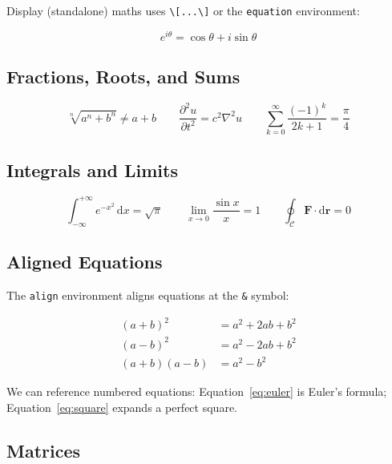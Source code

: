 \documentclass[12pt, a4paper]{article}
\theoremstyle{definition}
\theoremstyle{plain}
\theoremstyle{remark}
\newcommand{\dx}{\,\mathrm{d}x}        %
\begin{document}
Display (standalone) maths uses \verb|\[...\]| or the
\texttt{equation} environment:

\begin{equation}
  \label{eq:euler}
  e^{i\theta} = \cos\theta + i\sin\theta
\end{equation}

\subsection{Fractions, Roots, and Sums}

\[
  \sqrt[n]{a^n + b^n} \neq a + b
  \qquad
  \frac{\partial^2 u}{\partial t^2} = c^2 \nabla^2 u
  \qquad
  \sum_{k=0}^{\infty} \frac{(-1)^k}{2k+1} = \frac{\pi}{4}
\]

\subsection{Integrals and Limits}

\[
  \int_{-\infty}^{+\infty} e^{-x^2} \dx = \sqrt{\pi}
  \qquad
  \lim_{x \to 0} \frac{\sin x}{x} = 1
  \qquad
  \oint_{\mathcal{C}} \mathbf{F} \cdot \mathrm{d}\mathbf{r} = 0
\]

\subsection{Aligned Equations}

The \texttt{align} environment aligns equations at the \texttt{\&} symbol:

\begin{align}
  (a + b)^2 &= a^2 + 2ab + b^2 \label{eq:square}\\
  (a - b)^2 &= a^2 - 2ab + b^2 \label{eq:diffsquare}\\
  (a + b)(a - b) &= a^2 - b^2   \label{eq:diffofquares}
\end{align}

We can reference numbered equations: Equation~\eqref{eq:euler} is Euler's
formula; Equation~\eqref{eq:square} expands a perfect square.

\subsection{Matrices}
\end{document}
